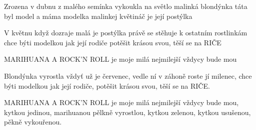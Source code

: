 \resetVars
{}
\MakeHeader
\Lyrics

Zrozena v dubnu z malého semínka
vykoukla na světlo malinká blondýnka
táta byl model a máma modelka
malinkej květináč je její postýlka

V květnu když dozraje malá je postýlka
právě se stěhuje k ostatním rostlinkám
chce býti modelkou jak její rodiče
potěšit krásou svou, těší se na RIČE

MARIHUANA A ROCK'N ROLL
je moje milá nejmilejší vždycy bude mou

Blondýnka vyrostla vždyť už je červenec,
vedle ní v záhoně roste jí milenec,
chce býti modelkou jak její rodiče,
potěšit krásou svou, těší se na RIČE.

MARIHUANA A ROCK'N ROLL
je moje milá nejmilejší vždycy bude mou,
kytkou jedinou, marihuanou pělkně vyrostlou,
kytkou zelenou, kytkou usušenou,
pěkně vykouřenou.

\Next

